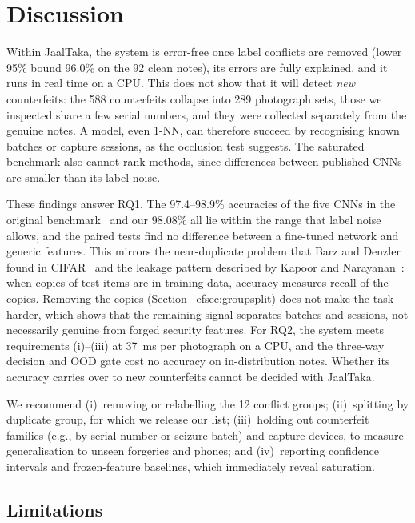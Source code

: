 \documentclass[pdflatex,sn-mathphys-num]{sn-jnl}
\begin{document}
\section{Discussion}\label{sec:discussion}

Within JaalTaka, the system is error-free once label conflicts are removed (lower 95\%
bound 96.0\% on the 92 clean notes), its errors are fully explained, and it runs in real
time on a CPU. This does not show that it will detect \emph{new} counterfeits: the 588
counterfeits collapse into 289 photograph sets, those we inspected share a few serial
numbers, and they were collected separately from the genuine notes. A model, even 1-NN,
can therefore succeed by recognising known batches or capture sessions, as the occlusion
test suggests. The saturated benchmark also cannot rank methods, since differences
between published CNNs are smaller than its label noise.

These findings answer RQ1. The 97.4--98.9\% accuracies of the five CNNs in the original
benchmark~\cite{piyas2025jaaltaka} and our 98.08\% all lie within the range that label
noise allows, and the paired tests find no difference between a fine-tuned network and
generic features. This mirrors the near-duplicate problem that Barz and Denzler found in
CIFAR~\cite{barz2020cifair} and the leakage pattern described by Kapoor and
Narayanan~\cite{kapoor2023leakage}: when copies of test items are in training data,
accuracy measures recall of the copies. Removing the copies
(Section~
ef{sec:groupsplit}) does not make the task harder, which shows that the
remaining signal separates batches and sessions, not necessarily genuine from forged
security features. For RQ2, the system meets requirements
(i)--(iii) at 37~ms per photograph on a CPU, and the three-way decision and OOD gate cost
no accuracy on in-distribution notes. Whether its accuracy carries over to new
counterfeits cannot be decided with JaalTaka.

We recommend (i)~removing or relabelling the 12 conflict groups; (ii)~splitting by
duplicate group, for which we release our list; (iii)~holding out counterfeit families
(e.g., by serial number or seizure batch) and capture devices, to measure generalisation
to unseen forgeries and phones; and (iv)~reporting confidence intervals and
frozen-feature baselines, which immediately reveal saturation.

\subsection{Limitations}\label{sec:limits}
\end{document}
